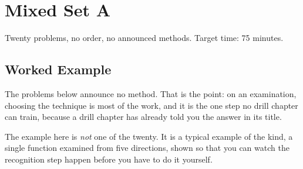 \chapter{Mixed Set A}

Twenty problems, no order, no announced methods. Target time: 75 minutes.

\section{Worked Example}

The problems below announce no method. That is the point: on an
examination, choosing the technique is most of the work, and it is the one
step no drill chapter can train, because a drill chapter has already told
you the answer in its title.

The example here is \emph{not} one of the twenty. It is a typical example of
the kind, a single function examined from five directions, shown so
that you can watch the recognition step happen before you have to do it
yourself.

